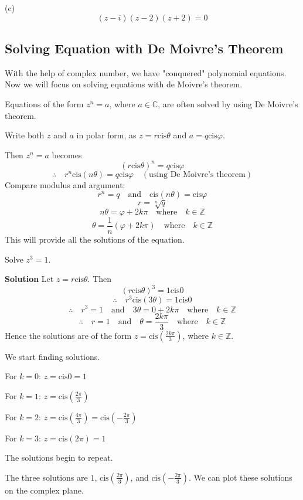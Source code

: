 \documentclass[
	12pt, %
	fleqn, %
	a4paper, %
]{LegrandOrangeBook}
\begin{document}
(c)
\[
(z - i)(z - 2)(z + 2) = 0
\]
\subsection{Solving Equation with De Moivre's Theorem}
With the help of complex number, we have "conquered" polynomial equations. Now we will focus on solving
equations with de Moivre's theorem. 

Equations of the form $z^n = a$, where $a \in \mathbb{C}$, are often solved by using De Moivre's theorem.

Write both $z$ and $a$ in polar form, as $z = r \text{cis} \theta$ and $a = q \text{cis} \varphi$.

Then $z^n = a$ becomes
\[
(r \text{cis} \theta)^n = q \text{cis} \varphi
\]
\[
\therefore \quad r^n \text{cis}(n\theta) = q \text{cis} \varphi \quad (\text{using De Moivre's theorem})
\]
Compare modulus and argument:
\[
r^n = q \quad \text{and} \quad \text{cis}(n\theta) = \text{cis} \varphi
\]
\[
r = \sqrt[n]{q}
\]
\[
n\theta = \varphi + 2k\pi \quad \text{where} \quad k \in \mathbb{Z}
\]
\[
\theta = \frac{1}{n} (\varphi + 2k\pi) \quad \text{where} \quad k \in \mathbb{Z}
\]
This will provide all the solutions of the equation.

\begin{example}
    Solve \( z^3 = 1 \).
\end{example}
\textbf{Solution}
Let \( z = r \text{cis} \theta \). Then
\[
(r \text{cis} \theta)^3 = 1 \text{cis} 0
\]
\[
\therefore \quad r^3 \text{cis}(3\theta) = 1 \text{cis} 0
\]
\[
\therefore \quad r^3 = 1 \quad \text{and} \quad 3\theta = 0 + 2k\pi \quad \text{where} \quad k \in \mathbb{Z}
\]
\[
\therefore \quad r = 1 \quad \text{and} \quad \theta = \frac{2k\pi}{3} \quad \text{where} \quad k \in \mathbb{Z}
\]
Hence the solutions are of the form \( z = \text{cis}\left(\frac{2k\pi}{3}\right) \), where \( k \in \mathbb{Z} \).

We start finding solutions.

For \( k = 0 \): \( z = \text{cis} 0 = 1 \)

For \( k = 1 \): \( z = \text{cis}\left(\frac{2\pi}{3}\right) \)

For \( k = 2 \): \( z = \text{cis}\left(\frac{4\pi}{3}\right) = \text{cis}\left(-\frac{2\pi}{3}\right) \)

For \( k = 3 \): \( z = \text{cis}(2\pi) = 1 \)

The solutions begin to repeat.

The three solutions are \( 1 \), \( \text{cis}\left(\frac{2\pi}{3}\right) \), and \( \text{cis}\left(-\frac{2\pi}{3}\right) \).
We can plot these solutions on the complex plane.
\end{document}
